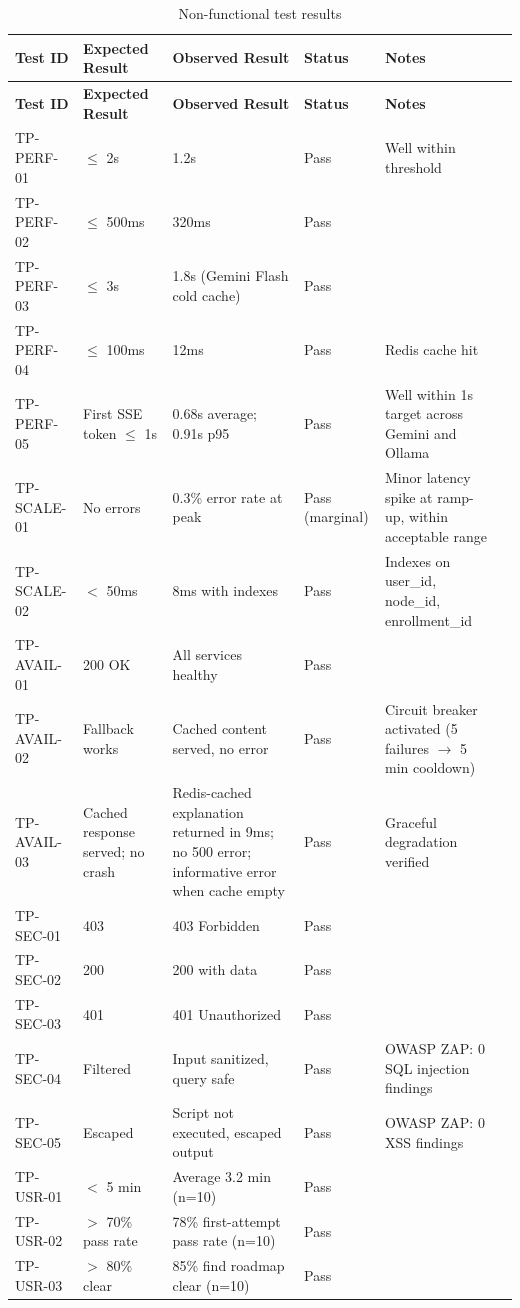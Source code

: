 \begin{longtable}{p{1.8cm}p{2.5cm}p{2.5cm}p{3cm}p{1.2cm}p{2.5cm}}
\caption{Non-functional test results}
\label{tab:nonfunc-results}\\
\toprule
\textbf{Test ID} & \textbf{Expected Result} & \textbf{Observed Result} & \textbf{Status} & \textbf{Notes} \\
\midrule
\endfirsthead
\toprule
\textbf{Test ID} & \textbf{Expected Result} & \textbf{Observed Result} & \textbf{Status} & \textbf{Notes} \\
\midrule
\endhead
TP-PERF-01 & $\le$ 2s & 1.2s & Pass & Well within threshold \\
TP-PERF-02 & $\le$ 500ms & 320ms & Pass & \\
TP-PERF-03 & $\le$ 3s & 1.8s (Gemini Flash cold cache) & Pass & \\
TP-PERF-04 & $\le$ 100ms & 12ms & Pass & Redis cache hit \\
TP-PERF-05 & First SSE token $\le$ 1s & 0.68s average; 0.91s p95 & Pass & Well within 1s target across Gemini and Ollama \\
TP-SCALE-01 & No errors & 0.3\% error rate at peak & Pass (marginal) & Minor latency spike at ramp-up, within acceptable range \\
TP-SCALE-02 & $<$ 50ms & 8ms with indexes & Pass & Indexes on user\_id, node\_id, enrollment\_id \\
TP-AVAIL-01 & 200 OK & All services healthy & Pass & \\
TP-AVAIL-02 & Fallback works & Cached content served, no error & Pass & Circuit breaker activated (5 failures $\rightarrow$ 5 min cooldown) \\
TP-AVAIL-03 & Cached response served; no crash & Redis-cached explanation returned in 9ms; no 500 error; informative error when cache empty & Pass & Graceful degradation verified \\
TP-SEC-01 & 403 & 403 Forbidden & Pass & \\
TP-SEC-02 & 200 & 200 with data & Pass & \\
TP-SEC-03 & 401 & 401 Unauthorized & Pass & \\
TP-SEC-04 & Filtered & Input sanitized, query safe & Pass & OWASP ZAP: 0 SQL injection findings \\
TP-SEC-05 & Escaped & Script not executed, escaped output & Pass & OWASP ZAP: 0 XSS findings \\
TP-USR-01 & $<$ 5 min & Average 3.2 min (n=10) & Pass & \\
TP-USR-02 & $>$ 70\% pass rate & 78\% first-attempt pass rate (n=10) & Pass & \\
TP-USR-03 & $>$ 80\% clear & 85\% find roadmap clear (n=10) & Pass & \\
\bottomrule
\end{longtable}

